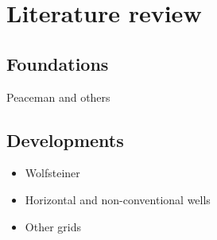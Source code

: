 
\section{Literature review} %
\label{sec:literature_review}

\subsection{Foundations} %
\label{sub:foundations}
Peaceman and others

\subsection{Developments} %
\label{sub:developments}
\begin{itemize}
    \item Wolfsteiner
    \item Horizontal and non-conventional wells
    \item Other grids
\end{itemize}

